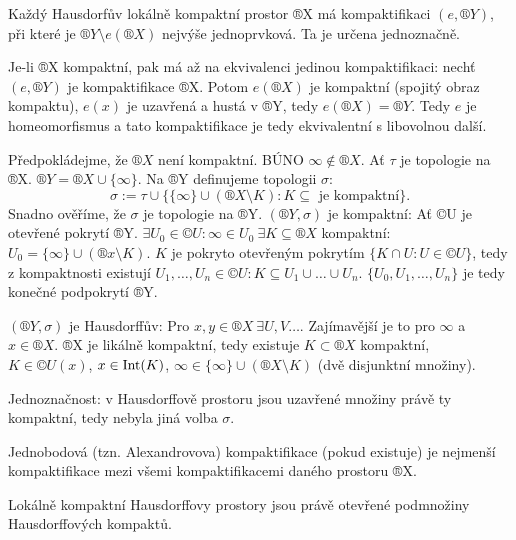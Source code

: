 \documentclass[12pt]{article}					%
\begin{document}
    \begin{tvrzeni}
        Každý Hausdorfův lokálně kompaktní prostor ®X má kompaktifikaci $(e, ®Y)$, při které je $®Y \setminus e(®X)$ nejvýše jednoprvková. Ta je určena jednoznačně.
        \begin{dukazin}
            Je-li ®X kompaktní, pak má až na ekvivalenci jedinou kompaktifikaci: nechť $(e, ®Y)$ je kompaktifikace ®X. Potom $e(®X)$ je kompaktní (spojitý obraz kompaktu), $e(x)$ je uzavřená a hustá v ®Y, tedy $e(®X) = ®Y$. Tedy $e$ je homeomorfismus a tato kompaktifikace je tedy ekvivalentní s libovolnou další.

            Předpokládejme, že $®X$ není kompaktní. BÚNO $∞ \notin ®X$. Ať $\tau$ je topologie na ®X. $®Y = ®X \cup \{∞\}$. Na ®Y definujeme topologii $\sigma$:
            $$\sigma := \tau \cup \{\{∞\} \cup (®X \setminus K): K \subseteq\text{ je kompaktní}\}.$$
            Snadno ověříme, že $\sigma$ je topologie na ®Y. $(®Y, \sigma)$ je kompaktní: Ať ©U je otevřené pokrytí ®Y. $\exists U_0 \in ©U: ∞ \in U_0\ \exists K \subseteq ®X$ kompaktní: $U_0 = \{∞\} \cup (®x \setminus K)$. $K$ je pokryto otevřeným pokrytím $\{K \cap U: U\in ©U\}$, tedy z kompaktnosti existují $U_1, …, U_n \in ©U: K \subseteq U_1 \cup … \cup U_n$. $\{U_0, U_1, …, U_n\}$ je tedy konečné podpokrytí ®Y.

            $(®Y, \sigma)$ je Hausdorffův: Pro $x, y \in ®X\ \exists U, V …$. Zajímavější je to pro $∞$ a $x \in ®X$. ®X je likálně kompaktní, tedy existuje $K \subset ®X$ kompaktní, $K \in ©U(x)$, $x \in \operatorname{Int}(K)$, $∞ \in \{∞\} \cup (®X\setminus K)$ (dvě disjunktní množiny).

            Jednoznačnost: v Hausdorffově prostoru jsou uzavřené množiny právě ty kompaktní, tedy nebyla jiná volba $\sigma$.
        \end{dukazin}
    \end{tvrzeni}

    \begin{poznamka}
        Jednobodová (tzn. Alexandrovova) kompaktifikace (pokud existuje) je nejmenší kompaktifikace mezi všemi kompaktifikacemi daného prostoru ®X.

        Lokálně kompaktní Hausdorffovy prostory jsou právě otevřené podmnožiny Hausdorffových kompaktů.
    \end{poznamka}

\end{document}

